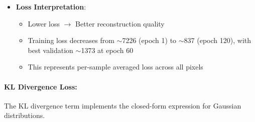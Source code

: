 \documentclass[conference]{IEEEtran}
\begin{document}
\begin{itemize}
    \item \textbf{Loss Interpretation}:
    \begin{itemize}
        \item Lower loss $\rightarrow$ Better reconstruction quality
        \item Training loss decreases from $\sim$7226 (epoch 1) to $\sim$837 (epoch 120), with best validation $\sim$1373 at epoch 60
        \item This represents per-sample averaged loss across all pixels
    \end{itemize}
\end{itemize}

\paragraph{KL Divergence Loss:}

The KL divergence term implements the closed-form expression for Gaussian distributions.
\end{document}
